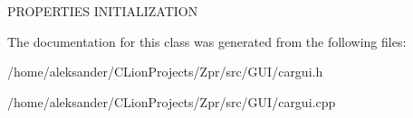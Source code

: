 P\-R\-O\-P\-E\-R\-T\-I\-E\-S I\-N\-I\-T\-I\-A\-L\-I\-Z\-A\-T\-I\-O\-N 

The documentation for this class was generated from the following files\-:\begin{DoxyCompactItemize}
\item 
/home/aleksander/\-C\-Lion\-Projects/\-Zpr/src/\-G\-U\-I/cargui.\-h\item 
/home/aleksander/\-C\-Lion\-Projects/\-Zpr/src/\-G\-U\-I/cargui.\-cpp\end{DoxyCompactItemize}
